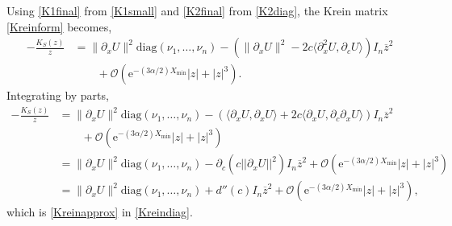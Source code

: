 \documentclass[review,onefignum,onetabnum]{siamart171218}
\newcommand{\rme}{\mathrm{e}}
\newcommand{\vI}{\bm{\mathit{I}}}
\newcommand{\vK}{\bm{\mathit{K}}}
\begin{document}
Using \cref{K1final} from \cref{K1small} and \cref{K2final} from \cref{K2diag}, the Krein matrix \cref{Kreinform} becomes,
\[%
\begin{aligned}
-\frac{\vK_S(z)}{z}&= \|\partial_xU\|^2 \text{diag}(\nu_1, \dots, \nu_n)
- ( \|\partial_xU\|^2 -2 c \langle \partial_x^2U, \partial_cU \rangle) \vI_n \overline{z}^2 \\
&\qquad + \mathcal{O}(\rme^{-(3 \alpha/2) X_{\mathrm{min}}}|z| + |z|^3).
\end{aligned}
\]%
Integrating by parts,
\[
\begin{aligned}
-\frac{\vK_S(z)}{z}
&= \|\partial_xU\|^2 \text{diag}(\nu_1, \dots, \nu_n) - \left( \langle \partial_xU, \partial_xU \rangle + 2c\langle \partial_xU,\partial_c\partial_xU\rangle \right)\vI_n\overline{z}^2\\
&\qquad + \mathcal{O}(\rme^{-(3 \alpha/2) X_{\mathrm{min}}}|z| + |z|^3)  \\
&= \|\partial_xU\|^2 \text{diag}(\nu_1, \dots, \nu_n) -\partial_c\left( c||\partial_xU||^2 \right) \vI_n \overline{z}^2  + \mathcal{O}(\rme^{-(3 \alpha/2) X_{\mathrm{min}}}|z| + |z|^3) \\
&= \|\partial_xU\|^2 \text{diag}(\nu_1, \dots, \nu_n) + d''(c) \vI_n \overline{z}^2  + \mathcal{O}(\rme^{-(3 \alpha/2) X_{\mathrm{min}}}|z| + |z|^3),
\end{aligned}
\]
which is \cref{Kreinapprox} in \cref{Kreindiag}.



%
%
%
\end{document}
